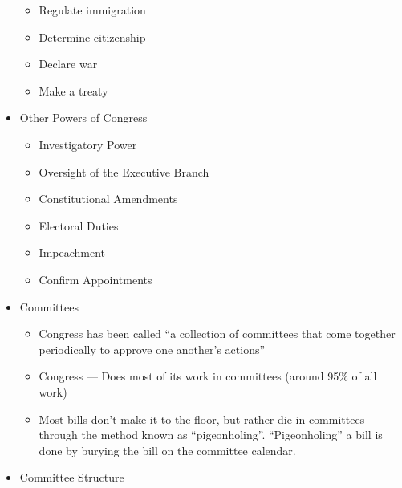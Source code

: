\documentclass[12pt]{article}
\begin{document}
\begin{itemize}
\begin{itemize}
      \item Regulate immigration

      \item Determine citizenship

      \item Declare war

      \item Make a treaty

    \end{itemize}

  \item Other Powers of Congress

    \begin{itemize}

      \item Investigatory Power

      \item Oversight of the Executive Branch

      \item Constitutional Amendments

      \item Electoral Duties

      \item Impeachment

      \item Confirm Appointments

    \end{itemize}

  \item Committees

    \begin{itemize}

      \item Congress has been called “a collection of committees that come together periodically to approve one another's actions”

      \item Congress — Does most of its work in committees (around 95\% of all work)

      \item Most bills don't make it to the floor, but rather die in committees through the method known as “pigeonholing”. “Pigeonholing” a bill is done by burying the bill on the committee calendar.

    \end{itemize}

  \item Committee Structure


\end{itemize}
\end{document}
